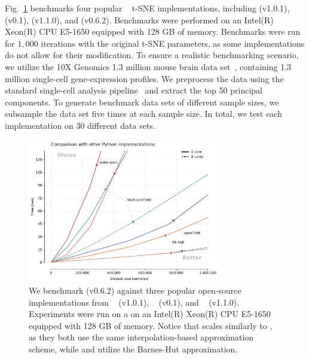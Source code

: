 \documentclass[article]{jss}
\newcommand{\opentsne}{\pkg{openTSNE}\xspace}
\begin{document}
Fig.~\ref{fig:benchmarks_py} benchmarks four popular ~\citep{vanrossum1995python} t-SNE implementations, including  (v1.0.1),  (v0.1),  (v1.1.0), and \opentsne (v0.6.2). Benchmarks were performed on an Intel(R) Xeon(R) CPU E5-1650 equipped with 128 GB of memory. Benchmarks were run for $1,000$ iterations with the original t-SNE parameters, as some implementations do not allow for their modification. To ensure a realistic benchmarking scenario, we utilize the 10X Genomics 1.3 million mouse brain data set~\citep{cao2019single}, containing 1.3 million single-cell gene-expression profiles. We preprocess the data using the standard single-cell analysis pipeline~\citep{kiselev2019challenges} and extract the top 50 principal components. To generate benchmark data sets of different sample sizes, we subsample the data set five times at each sample size. In total, we test each implementation on 30 different data sets.

\begin{figure}[ht]
  \centering
  \includegraphics[width=0.75\textwidth]{benchmarks_python-final}
  \caption{\label{fig:benchmarks_py}
  We benchmark \opentsne (v0.6.2) against three popular open-source
  implementations from ~\citep{pedregosa2011scikit}
  (v1.0.1), ~\citep{Ulyanov2016} (v0.1), and
  ~\citep{linderman2019fast} (v1.1.0). Experiments were run on a
  on an Intel(R) Xeon(R) CPU E5-1650 equipped with 128 GB of memory. Notice
  that \opentsne scales similarly to , as they both use the
  same interpolation-based approximation scheme, while  and
   utilize the Barnes-Hut approximation.
}
\end{figure}
\end{document}
